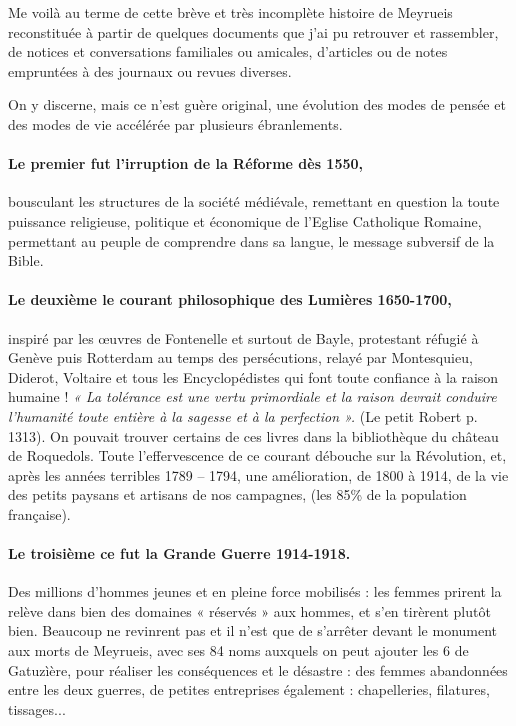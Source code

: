 
Me voilà au terme de cette brève et très incomplète histoire de Meyrueis reconstituée à partir
de quelques documents que j’ai pu retrouver et rassembler, de notices et conversations
familiales ou amicales, d’articles ou de notes empruntées à des journaux ou revues diverses.

On y discerne, mais ce n’est guère original, une évolution des modes de pensée et des modes
de vie accélérée par plusieurs ébranlements.

\paragraph{Le premier fut l’irruption de la Réforme dès 1550,}

bousculant les structures de la société médiévale, remettant en question la toute puissance
religieuse, politique et économique de l’Eglise Catholique Romaine, permettant au peuple de
comprendre dans sa langue, le message subversif de la Bible.

\paragraph{Le deuxième le courant philosophique des Lumières 1650-1700,}

inspiré par les œuvres de Fontenelle et surtout de Bayle, protestant réfugié à Genève puis
Rotterdam au temps des persécutions, relayé par Montesquieu, Diderot, Voltaire et tous les
Encyclopédistes qui font toute confiance à la raison humaine ! \emph{« La tolérance est une vertu
primordiale et la raison devrait conduire l’humanité toute entière à la sagesse et à la perfection ».}
(Le petit Robert p. 1313). On pouvait trouver certains de ces livres dans la bibliothèque du château de Roquedols.
Toute l’effervescence de ce courant débouche sur la Révolution, et, après les années terribles
1789 -- 1794, une amélioration, de 1800 à 1914, de la vie des petits paysans et artisans de nos
campagnes, (les 85\% de la population française).

\paragraph{Le troisième ce fut la Grande Guerre 1914-1918.}

Des millions d’hommes jeunes et en pleine force mobilisés : les femmes prirent la relève dans
bien des domaines « réservés » aux hommes, et s’en tirèrent plutôt bien. Beaucoup ne
revinrent pas et il n’est que de s’arrêter devant le monument aux morts de Meyrueis, avec ses
84 noms auxquels on peut ajouter les 6 de Gatuzìère, pour réaliser les conséquences et le
désastre : des femmes abandonnées entre les deux guerres, de petites entreprises également :
chapelleries, filatures, tissages...

